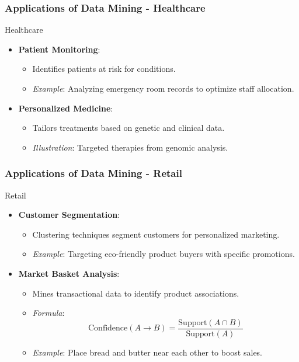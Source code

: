 \documentclass[aspectratio=169]{beamer}
\begin{document}
\begin{frame}[fragile]
    \frametitle{Applications of Data Mining - Healthcare}
    \begin{block}{Healthcare}
        \begin{itemize}
            \item \textbf{Patient Monitoring}:
                \begin{itemize}
                    \item Identifies patients at risk for conditions.
                    \item \textit{Example}: Analyzing emergency room records to optimize staff allocation.
                \end{itemize}
            \item \textbf{Personalized Medicine}:
                \begin{itemize}
                    \item Tailors treatments based on genetic and clinical data.
                    \item \textit{Illustration}: Targeted therapies from genomic analysis.
                \end{itemize}
        \end{itemize}
    \end{block}
\end{frame}

\begin{frame}[fragile]
    \frametitle{Applications of Data Mining - Retail}
    \begin{block}{Retail}
        \begin{itemize}
            \item \textbf{Customer Segmentation}:
                \begin{itemize}
                    \item Clustering techniques segment customers for personalized marketing.
                    \item \textit{Example}: Targeting eco-friendly product buyers with specific promotions.
                \end{itemize}
            \item \textbf{Market Basket Analysis}:
                \begin{itemize}
                    \item Mines transactional data to identify product associations.
                    \item \textit{Formula}:
                    \begin{equation}
                        \text{Confidence}(A \rightarrow B) = \frac{\text{Support}(A \cap B)}{\text{Support}(A)}
                    \end{equation}
                    \item \textit{Example}: Place bread and butter near each other to boost sales.
                \end{itemize}
        \end{itemize}
    \end{block}
\end{frame}
\end{document}
